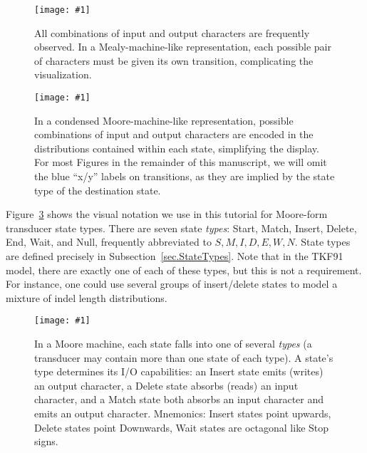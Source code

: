 \documentclass{article}
\newcommand{\secref}[1]{Subsection~\ref{sec.#1}}
\newcommand{\figref}[1]{Figure~\ref{Figures.#1}}
\newcommand{\figlabel}[1]{\label{Figures.#1}}
\newcommand{\easyfig}[4]{
\begin{figure}
\texttt{[image: \#1]}
\caption{ \figlabel{#3} #4}
\end{figure}}
\newcommand{\widepngfig}[2]{\easyfig{#1.png}{width=\textwidth}{#1}{#2}}
\newcommand{\widepdffig}[2]{\easyfig{#1-fig.pdf}{width=\textwidth}{#1}{#2}}
\begin{document}
\widepngfig{fanned-emission}
{All combinations of input and output characters are frequently observed.  
In a Mealy-machine-like representation, each possible pair of characters must be given its own transition, complicating the visualization.}

\widepngfig{condensed-emission}
{In a condensed Moore-machine-like representation, possible combinations of input and output characters are encoded in the distributions contained within each state,
simplifying the display.  
For most Figures in the remainder of this manuscript, we will omit the blue ``x/y'' labels on transitions,
as they are implied by the state type of the destination state.}

\figref{legend} shows the visual notation we use in this tutorial for Moore-form transducer state types.
There are seven state {\em types}: Start, Match, Insert, Delete, End, Wait, and Null, frequently abbreviated to $S,M,I,D,E,W,N$.
State types are defined precisely in \secref{StateTypes}.
Note that in the TKF91 model, there are exactly one of each of these types, but this is not a requirement.  For instance, one could use several groups of insert/delete states to model a mixture of indel length distributions.  

\widepdffig{legend}{In a Moore machine, each state falls into one of several {\em types} (a transducer may contain more than one state of each type).  
A state's type determines its I/O capabilities:
 an Insert state emits (writes) an output character,
 a Delete state absorbs (reads) an input character,
and
 a Match state both absorbs an input character and emits an output character.
Mnemonics: Insert states point upwards, Delete states point Downwards, Wait states are octagonal like Stop signs.
}
\end{document}
